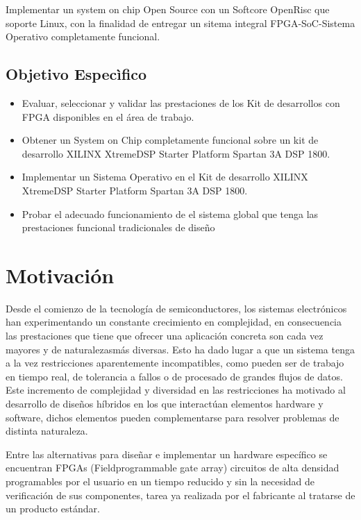 Implementar un system on chip Open Source con un Softcore OpenRisc que soporte Linux, con la finalidad de entregar un  sitema integral FPGA-SoC-Sistema Operativo completamente funcional.

\subsection{Objetivo Especìfico}
\begin{itemize}
\item Evaluar, seleccionar y validar las prestaciones de los Kit de desarrollos con FPGA disponibles en el área de trabajo.
\item Obtener un System on Chip completamente funcional sobre un kit de desarrollo XILINX XtremeDSP Starter Platform Spartan 3A DSP 1800.
\item Implementar un Sistema Operativo en el Kit de desarrollo XILINX XtremeDSP Starter Platform Spartan 3A DSP 1800.
\item Probar el adecuado funcionamiento de el sistema global que tenga las  prestaciones funcional  
tradicionales de diseño
\end{itemize}

\section{Motivación} 

Desde el comienzo de la tecnología de semiconductores, los sistemas electrónicos han experimentando un constante crecimiento en complejidad, en consecuencia las prestaciones que tiene que ofrecer una aplicación concreta son cada vez mayores y de naturalezasmás diversas.
 Esto ha dado lugar a que un sistema tenga a la vez restricciones aparentemente incompatibles, como pueden ser de trabajo en tiempo real, de tolerancia a fallos o de procesado de grandes flujos de datos. 
Este incremento de complejidad y diversidad en las restricciones ha motivado  al desarrollo de diseños híbridos en los que interactúan elementos hardware y software, dichos elementos pueden complementarse para resolver problemas de distinta naturaleza.

Entre las alternativas para diseñar e implementar un hardware específico se encuentran FPGAs (Fieldprogrammable gate array) circuitos de alta densidad programables por el usuario en un tiempo reducido y sin la necesidad de verificación de sus componentes, tarea ya realizada por el fabricante al tratarse de un producto estándar.


